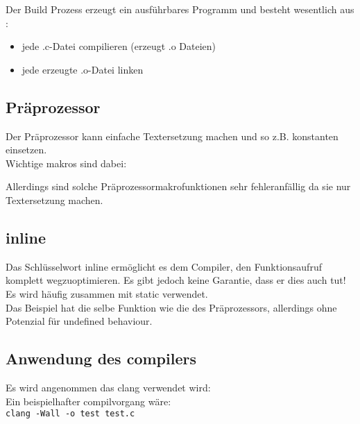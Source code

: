 Der Build Prozess erzeugt ein ausführbares Programm und besteht wesentlich aus :
\begin{itemize}[itemsep=1pt, parsep=0pt]
    \item jede .c-Datei compilieren (erzeugt .o Dateien)
    \item jede erzeugte .o-Datei linken
\end{itemize}


\subsection{Präprozessor}

Der Präprozessor kann einfache Textersetzung machen und so z.B. konstanten einsetzen.\\
Wichtige makros sind dabei:



Allerdings sind solche Präprozessormakrofunktionen sehr fehleranfällig da sie nur Textersetzung machen.

\subsection{inline}

Das Schlüsselwort inline ermöglicht es dem Compiler, den Funktionsaufruf komplett wegzuoptimieren. Es gibt jedoch keine Garantie, dass er dies auch tut! Es wird häufig zusammen mit static verwendet.\\



Das Beispiel hat die selbe Funktion wie die des Präprozessors, allerdings ohne Potenzial für undefined behaviour.

\subsection{Anwendung des compilers}

Es wird angenommen das clang verwendet wird:\\

Ein beispielhafter compilvorgang wäre:\\
\verb|clang -Wall -o test test.c|

